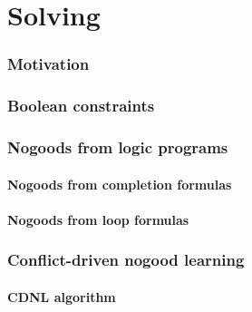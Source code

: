 \part{Solving}
\section{Motivation}


\section{Boolean constraints}

\section{Nogoods from logic programs}
\subsection{Nogoods from completion formulas}
% 
\subsection{Nogoods from loop formulas}
% 
\section{Conflict-driven nogood learning}

% 
% 
% 
\subsection{CDNL algorithm}
% 
